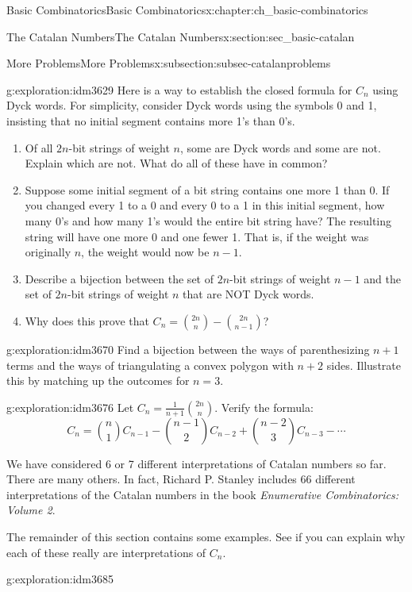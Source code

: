 \documentclass[oneside,10pt,]{book}
\numberwithin{equation}{chapter}
\begin{document}
\begin{chapterptx}{Basic Combinatorics}{}{Basic Combinatorics}{}{}{x:chapter:ch_basic-combinatorics}
\begin{sectionptx}{The Catalan Numbers}{}{The Catalan Numbers}{}{}{x:section:sec_basic-catalan}
\begin{subsectionptx}{More Problems}{}{More Problems}{}{}{x:subsection:subsec-catalanproblems}
\begin{exploration}{}{g:exploration:idm3629}
Here is a way to establish the closed formula for \(C_n\) using Dyck words.  For simplicity, consider Dyck words using the symbols 0 and 1, insisting that no initial segment contains more 1's than 0's.%
\begin{enumerate}[font=\bfseries,label=(\alph*),ref=\alph*]
\item{}Of all \(2n\)-bit strings of weight \(n\), some are Dyck words and some are not.  Explain which are not.  What do all of these have in common?%
\item{}Suppose some initial segment of a bit string contains one more 1 than 0.  If you changed every 1 to a 0 and every 0 to a 1 in this initial segment, how many 0's and how many 1's would the entire bit string have?%
The resulting string will have one more 0 and one fewer 1.  That is, if the weight was originally \(n\), the weight would now be \(n-1\).%
\item{}Describe a bijection between the set of \(2n\)-bit strings of weight \(n-1\) and the set of \(2n\)-bit strings of weight \(n\) that are NOT Dyck words.%
\item{}Why does this prove that \(C_n = \binom{2n}{n} - \binom{2n}{n-1}\)?%
\end{enumerate}
\end{exploration}
\begin{exploration}{}{g:exploration:idm3670}%
Find a bijection between the ways of parenthesizing \(n+1\) terms and the ways of triangulating a convex polygon with \(n+2\) sides.  Illustrate this by matching up the outcomes for \(n = 3\).%
\end{exploration}
\begin{exploration}{}{g:exploration:idm3676}%
Let \(C_{n} = \frac{1}{n + 1}\binom{2n}{n}\). Verify the formula:%
\begin{equation*}
C_{n} = \binom{n}{1} C_{n - 1} - \binom{n - 1}{2} C_{n - 2} + \binom{n - 2}{3} C_{n - 3} - \cdots
\end{equation*}
%
\end{exploration}
We have considered 6 or 7 different interpretations of Catalan numbers so far.  There are many others.  In fact, Richard P. Stanley includes 66 different interpretations of the Catalan numbers in the book \emph{Enumerative Combinatorics: Volume 2}.%
\par
The remainder of this section contains some examples.  See if you can explain why each of these really are interpretations of \(C_n\).%
\begin{exploration}{}{g:exploration:idm3685}%

\end{exploration}
\end{subsectionptx}
\end{sectionptx}
\end{chapterptx}
\end{document}
